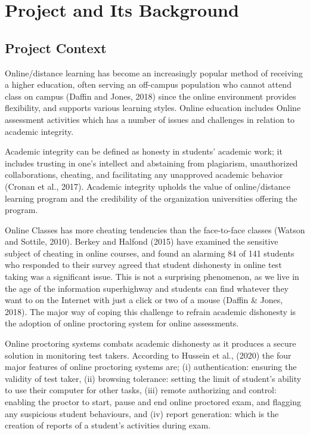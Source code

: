 \chapter{Project and Its Background}

\section{Project Context}

Online/distance learning has become an increasingly popular method of receiving a higher education, often serving an off-campus population who cannot attend class on campus (Daffin and Jones, 2018) since the online environment provides flexibility, and supports various learning styles.
Online education includes Online assessment activities which has a number of issues and challenges in relation to academic integrity.

Academic integrity can be defined as honesty in students' academic work; it includes trusting in one’s intellect and abstaining from plagiarism, unauthorized collaborations, cheating, and facilitating any unapproved academic behavior (Cronan et al., 2017).
Academic integrity upholds the value of online/distance learning program and the credibility of the organization universities offering the program.

Online Classes has more cheating tendencies than the face-to-face classes (Watson and Sottile, 2010).
Berkey and Halfond (2015) have examined the sensitive subject of cheating in online courses, and found an alarming 84 of 141 students who responded to their survey agreed that student dishonesty in online test taking was a significant issue.
This is not a surprising phenomenon, as we live in the age of the information superhighway and students can find whatever they want to on the Internet with just a click or two of a mouse (Daffin \& Jones, 2018).
The major way of coping this challenge to refrain academic dishonesty is the adoption of online proctoring system for online assessments.

Online proctoring systems combats academic dishonesty as it produces a secure solution in monitoring test takers.
According to Hussein et al., (2020) the four major features of online proctoring systems are; (i) authentication: ensuring the validity of test taker, (ii) browsing tolerance: setting the limit of student’s ability to use their computer for other tasks, (iii) remote authorizing and control: enabling the proctor to start, pause and end online proctored exam, and flagging any suspicious student behaviours, and (iv) report generation: which is the creation of reports of a student’s activities during exam.

